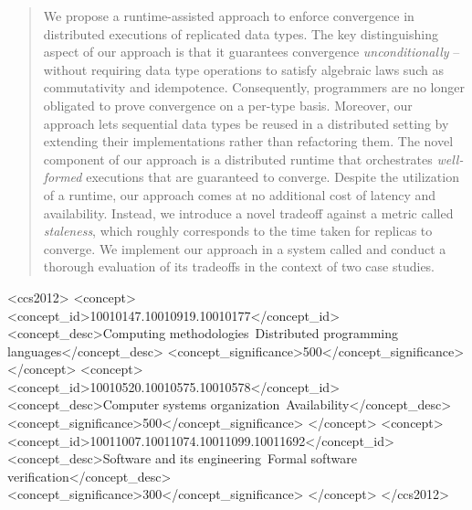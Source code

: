 \documentclass[sigplan,screen]{acmart}
\begin{document}
\author{Nicholas Lewchenko}
%

\begin{abstract}
  We propose a runtime-assisted approach to enforce convergence in
  distributed executions of replicated data types. The key
  distinguishing aspect of our approach is that it guarantees
  convergence \emph{unconditionally} -- without requiring data
  type operations to satisfy algebraic laws such as commutativity and
  idempotence. Consequently, programmers are no longer obligated to
  prove convergence on a per-type basis. Moreover, our approach lets
  sequential data types be reused in a distributed setting by
  extending their implementations rather than refactoring them.
  The novel component of our approach is a distributed runtime that
  orchestrates \emph{well-formed } executions that are guaranteed to
  converge. Despite the utilization of a runtime, our approach comes
  at no additional cost of latency and availability. Instead, we
  introduce a novel tradeoff against a metric called \emph{staleness},
  which roughly corresponds to the time taken for replicas to
  converge. We implement our approach in a system called \quark and
  conduct a thorough evaluation of its tradeoffs in the context of two
  case studies.
\end{abstract}


\begin{CCSXML}
<ccs2012>
<concept>
<concept_id>10010147.10010919.10010177</concept_id>
<concept_desc>Computing methodologies~Distributed programming languages</concept_desc>
<concept_significance>500</concept_significance>
</concept>
<concept>
<concept_id>10010520.10010575.10010578</concept_id>
<concept_desc>Computer systems organization~Availability</concept_desc>
<concept_significance>500</concept_significance>
</concept>
<concept>
<concept_id>10011007.10011074.10011099.10011692</concept_id>
<concept_desc>Software and its engineering~Formal software verification</concept_desc>
<concept_significance>300</concept_significance>
</concept>
</ccs2012>
\end{CCSXML}
\end{document}
